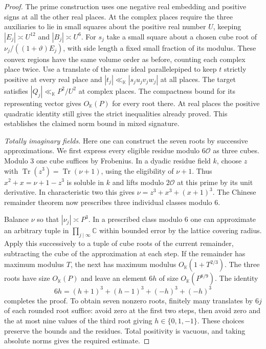 \documentclass[11pt,letterpaper]{article}
\theoremstyle{definition}
\numberwithin{equation}{section}
\begin{document}
\begin{proof}
The prime construction uses one negative real embedding and positive
signs at all the other real places. At the complex places require the
three auxiliaries to lie in small squares about the positive real
number $U$, keeping $|E_j|\asymp U^{12}$ and $|B_j|\asymp U^6$.
For $s_j$ take a small square about a chosen cube root of
$\nu_j/((1+\vartheta)E_j)$, with side length a fixed small fraction
of its modulus. These convex regions have the same volume order as
before, counting each complex place twice. Use a translate of the
same ideal parallelepiped to keep $t$ strictly positive at every
real place and $|t_j|\ll_{\mathbb K}|s_j u_jv_jw_j|$ at all places.
The target satisfies $|Q_j|\ll_{\mathbb K}P^2/U^2$ at complex
places. The compactness bound for its representing vector gives
$O_{\mathbb K}(P)$ for every root there. At real places the positive
quadratic identity still gives the strict inequalities already proved.
This establishes the claimed norm bound in mixed signature.

\smallskip\noindent
\emph{Totally imaginary fields.}
Here one can construct the seven roots by successive approximations.
We first express every eligible residue modulo $6\mathcal O$ as
three cubes. Modulo 3 one cube suffices by Frobenius. In a dyadic
residue field $k$, choose $z$ with
$\operatorname{Tr}(z^3)=\operatorname{Tr}(\nu+1)$, using the
eligibility of $\nu+1$. Thus
$x^2+x=\nu+1-z^3$ is soluble in $k$ and lifts modulo $2\mathcal O$
at this prime by its unit derivative. In characteristic two this
gives $\nu=z^3+x^3+(x+1)^3$. The Chinese remainder theorem now
prescribes three individual classes modulo 6.

Balance $\nu$ so that $|\nu_j|\asymp P^3$. In a prescribed class
modulo 6 one can approximate an arbitrary tuple in
$\prod_{j\mid\infty}\mathbb C$ within bounded error by the lattice
covering radius. Apply this successively to a tuple of cube roots
of the current remainder, subtracting the cube of the approximation
at each step. If the remainder has maximum modulus $T$, the next
has maximum modulus $O_{\mathbb K}(1+T^{2/3})$. The three roots
have size $O_{\mathbb K}(P)$ and leave an element $6h$ of size
$O_{\mathbb K}(P^{8/9})$. The identity
\[
  6h=(h+1)^3+(h-1)^3+(-h)^3+(-h)^3
\]
completes the proof. To obtain seven nonzero roots, finitely many
translates by $6j$ of each rounded root suffice: avoid zero at the
first two steps, then avoid zero and the at most nine values of the
third root giving $h\in\{0,1,-1\}$. These choices preserve the
bounds and the residues. Total positivity is vacuous, and taking
absolute norms gives the required estimate.
\end{proof}
\end{document}
